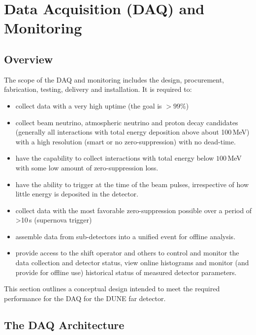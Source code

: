 \section{Data Acquisition (DAQ) and Monitoring}
\label{sec:daq}

\subsection{Overview}

The scope of the DAQ and monitoring includes the design, procurement, fabrication, testing, delivery and installation. It is required to:
\begin{itemize}
\item collect data with a very high uptime (the goal is $>99\%$)

\item collect beam neutrino, atmospheric neutrino and proton  decay candidates (generally all interactions
with total energy deposition above about 100\,MeV) with a high resolution (smart or no   zero-suppression) with no dead-time.

\item have the capability to collect interactions with total energy  below $100$\,MeV with some
 low amount of zero-suppression loss.

\item have the ability to trigger at the time of the beam pulses,  irrespective of how little energy is deposited in the detector.

\item collect data with the most favorable zero-suppression possible over a  period of >10\,s (supernova trigger)

\item assemble data from sub-detectors into a unified  event for offline analysis.
\item provide access to the shift operator and others to control and   monitor the data collection and detector status, view online
  histograms and monitor (and provide for offline use) historical  status of measured detector parameters. 

\end{itemize}
This section outlines a conceptual design intended to meet the required performance for the DAQ
for the DUNE far detector. 


\subsection{The DAQ Architecture}

